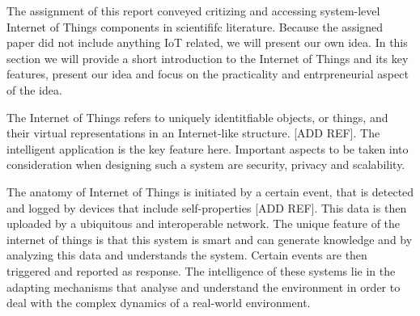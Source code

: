 The assignment of this report conveyed critizing and accessing system-level Internet of Things components in scientififc literature. 
Because the assigned paper did not include anything IoT related, we will present our own idea.
In this section we will provide a short introduction to the Internet of Things and its key features, present our idea and focus on the practicality and entrpreneurial aspect of the idea. 

The Internet of Things refers to uniquely identitfiable objects, or things, and their virtual representations in an Internet-like structure. [ADD REF]. 
The intelligent application is the key feature here. 
Important aspects to be taken into consideration when designing such a system are security, privacy and scalability. 

The anatomy of Internet of Things is initiated by a certain event, that is detected and logged by devices that include self-properties [ADD REF]. 
This data is then uploaded by a ubiquitous and interoperable network. 
The unique feature of the internet of things is that this system is smart and can generate knowledge and by analyzing this data and understands the system. 
Certain events are then triggered and reported as response. 
The intelligence of these systems lie in the adapting mechanisms that analyse and understand the environment in order to deal with the complex dynamics of a real-world environment. 


